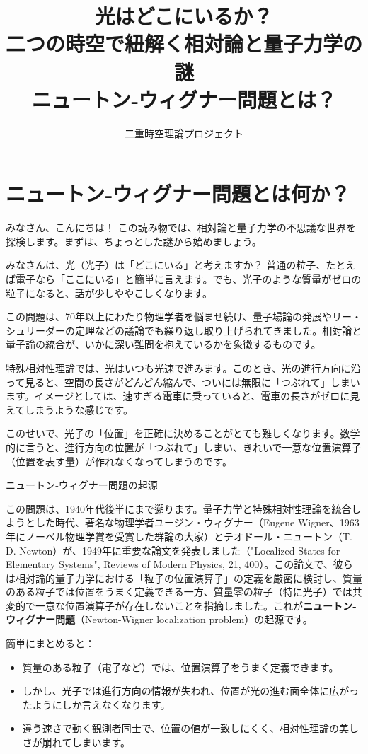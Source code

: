 \documentclass[dvipdfmx,12pt,a4paper]{article}
\title{光はどこにいるか？ \\二つの時空で紐解く相対論と量子力学の謎\\
ニュートン‐ウィグナー問題とは？}
\author{二重時空理論プロジェクト}
\date{}
\begin{document}
\maketitle
\tableofcontents
\newpage

\section{ニュートン‐ウィグナー問題とは何か？}

みなさん、こんにちは！ この読み物では、相対論と量子力学の不思議な世界を探検します。まずは、ちょっとした謎から始めましょう。

みなさんは、光（光子）は「どこにいる」と考えますか？ 普通の粒子、たとえば電子なら「ここにいる」と簡単に言えます。でも、光子のような質量がゼロの粒子になると、話が少しややこしくなります。

この問題は、70年以上にわたり物理学者を悩ませ続け、量子場論の発展やリー・シュリーダーの定理などの議論でも繰り返し取り上げられてきました。相対論と量子論の統合が、いかに深い難問を抱えているかを象徴するものです。

特殊相対性理論では、光はいつも光速で進みます。このとき、光の進行方向に沿って見ると、空間の長さがどんどん縮んで、ついには無限に「つぶれて」しまいます。イメージとしては、速すぎる電車に乗っていると、電車の長さがゼロに見えてしまうような感じです。

このせいで、光子の「位置」を正確に決めることがとても難しくなります。数学的に言うと、進行方向の位置が「つぶれて」しまい、きれいで一意な位置演算子（位置を表す量）が作れなくなってしまうのです。

\begin{itembox}[l]{ニュートン‐ウィグナー問題の起源}

この問題は、1940年代後半にまで遡ります。量子力学と特殊相対性理論を統合しようとした時代、著名な物理学者ユージン・ウィグナー（Eugene Wigner、1963年にノーベル物理学賞を受賞した群論の大家）とテオドール・ニュートン（T. D. Newton）が、1949年に重要な論文を発表しました（"Localized States for Elementary Systems", Reviews of Modern Physics, 21, 400）。この論文で、彼らは相対論的量子力学における「粒子の位置演算子」の定義を厳密に検討し、質量のある粒子では位置をうまく定義できる一方、質量零の粒子（特に光子）では共変的で一意な位置演算子が存在しないことを指摘しました。これが\textbf{ニュートン‐ウィグナー問題}（Newton-Wigner localization problem）の起源です。

\end{itembox}

簡単にまとめると：
\begin{itemize}
  \item 質量のある粒子（電子など）では、位置演算子をうまく定義できます。
  \item しかし、光子では進行方向の情報が失われ、位置が光の進む面全体に広がったようにしか言えなくなります。
  \item 違う速さで動く観測者同士で、位置の値が一致しにくく、相対性理論の美しさが崩れてしまいます。
\end{itemize}
\end{document}
